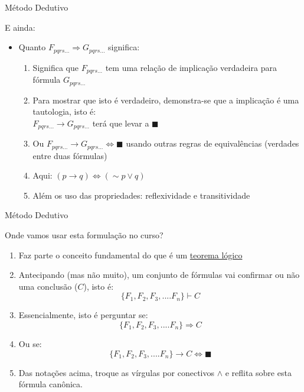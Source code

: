 \begin{frame}[t]{Método Dedutivo}

 E ainda:
  \begin{itemize}
  	
\item Quanto $F_{pqrs...}  \Rightarrow G_{pqrs...} $ significa:
  	 
  	\begin{enumerate}
  	\item Significa que $F_{pqrs...}$ tem uma relação de implicação verdadeira para fórmula $G_{pqrs...}$ 
  	
  	\item Para mostrar que isto é verdadeiro, demonstra-se que a implicação é uma
  	      tautologia, isto é: \\
  	      $F_{pqrs...} \rightarrow G_{pqrs...}$ terá que levar a $\blacksquare $
  	      
  	\item Ou   $F_{pqrs...} \rightarrow G_{pqrs...} \Leftrightarrow \blacksquare $  usando outras regras	de equivalências (verdades entre duas fórmulas)
  	
  	\item Aqui:  $(p \rightarrow q )  \Leftrightarrow  (\sim p \vee q )$
  	
  	
  	\item Além os uso das propriedades:  reflexividade e transitividade
  	
  	
  	\end{enumerate}

	\end{itemize}

  	
\end{frame}



\begin{frame}[t]{Método Dedutivo}

  Onde vamos usar esta formulação no curso?

 \begin{enumerate}

\item Faz parte o conceito fundamental do que é um \underline{teorema lógico}

\item Antecipando (mas não muito), um conjunto de fórmulas vai confirmar ou
não uma conclusão ($C$), isto é:
$$
\{ F_1, F_2, F_3, .... F_n  \}  \vdash C
$$
  
   \item Essencialmente, isto é perguntar se: 
$$\{ F_1, F_2, F_3, .... F_n  \} \Rightarrow C$$

   \item Ou se: 
$$\{ F_1, F_2, F_3, .... F_n  \} \rightarrow C \Leftrightarrow \blacksquare $$

  \item Das notações acima, troque as vírgulas 
  por  conectivos $\wedge$ e reflita sobre esta 
  fórmula canônica.

	\end{enumerate}

\end{frame}



